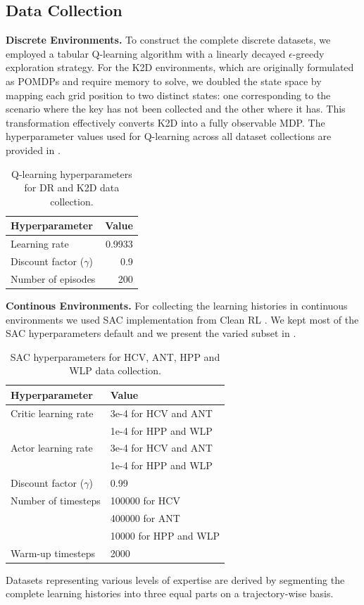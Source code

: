 \documentclass{article}
\begin{document}
\subsection{Data Collection}
\textbf{Discrete Environments.} To construct the complete discrete datasets, we employed a tabular Q-learning algorithm \citep{watkins1992q} with a linearly decayed
$\epsilon$-greedy exploration strategy. For the K2D environments, which are originally formulated as POMDPs and require memory to solve, we doubled the state space by mapping each grid position to two distinct states: one corresponding to the scenario where the key has not been collected and the other where it has. This transformation effectively converts K2D into a fully observable MDP. The hyperparameter values used for Q-learning across all dataset collections are provided in .
\begin{table}[ht]
\centering
\label{table:bc_hyp}
\caption{Q-learning hyperparameters for DR and K2D data collection.}
\begin{tabular}{l|r}
\toprule
Hyperparameter & Value \\
\midrule
Learning rate & 0.9933 \\
Discount factor ($\gamma$) & 0.9\\
Number of episodes & 200\\
\bottomrule
\end{tabular}
\label{tab:q_learning_params}
\end{table}
\textbf{Continous Environments.} For collecting the learning histories in continuous environments we used SAC implementation from Clean RL \citep{huang2022cleanrl}.
We kept most of the SAC hyperparameters default and we present the varied subset in .
\begin{table}[ht]
\centering
\caption{SAC hyperparameters for HCV, ANT, HPP and WLP data collection.}
\begin{tabular}{l|l}
\toprule
Hyperparameter & Value \\
\midrule
Critic learning rate & 3e-4 for HCV and ANT \\
& 1e-4 for HPP and WLP \\
Actor learning rate & 3e-4 for HCV and ANT \\
& 1e-4 for HPP and WLP \\
Discount factor ($\gamma$) & 0.99\\
Number of timesteps & 100000 for HCV\\
& 400000 for ANT\\
& 10000 for HPP and WLP\\
Warm-up timesteps & 2000\\
\bottomrule
\end{tabular}
\label{tab:sac_params}
\end{table}
Datasets representing various levels of expertise are derived by segmenting the complete learning histories into three equal parts on a trajectory-wise basis.
\FloatBarrier
\end{document}
